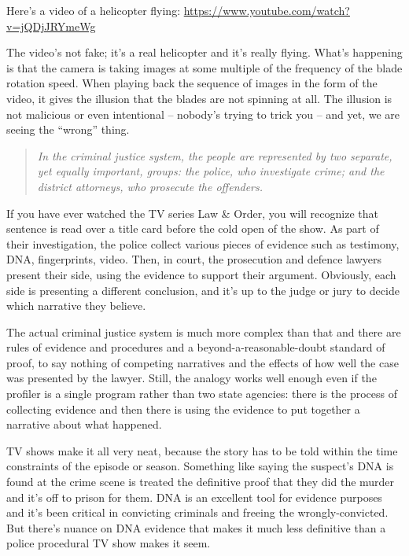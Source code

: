 




Here's a video of a helicopter flying: \url{https://www.youtube.com/watch?v=jQDjJRYmeWg} 

The video's not fake; it's a real helicopter and it's really flying. What's happening is that the camera is taking images at some multiple of the frequency of the blade rotation speed. When playing back the sequence of images in the form of the video, it gives the illusion that the blades are not spinning at all. The illusion is not malicious or even intentional -- nobody's trying to trick you -- and yet, we are seeing the ``wrong'' thing.

\vspace{-1em}
\begin{quote}
\textit{
In the criminal justice system, the people are represented by two separate, yet equally important, groups: the police, who investigate crime; and the district attorneys, who prosecute the offenders.
}
\end{quote}
\vspace{-1em}

If you have ever watched the TV series Law \& Order, you will recognize that sentence is read over a title card before the cold open of the show. As part of their investigation, the police collect various pieces of evidence such as testimony, DNA, fingerprints, video. Then, in court, the prosecution and defence lawyers present their side, using the evidence to support their argument. Obviously, each side is presenting a different conclusion, and it's up to the judge or jury to decide which narrative they believe.

The actual criminal justice system is much more complex than that and there are rules of evidence and procedures and a beyond-a-reasonable-doubt standard of proof, to say nothing of competing narratives and the effects of how well the case was presented by the lawyer. Still, the analogy works well enough even if the profiler is a single program rather than two state agencies: there is the process of collecting evidence and then there is using the evidence to put together a narrative about what happened. 

TV shows make it all very neat, because the story has to be told within the time constraints of the episode or season. Something like saying the suspect's DNA is found at the crime scene is treated the definitive proof that they did the murder and it's off to prison for them. DNA is an excellent tool for evidence purposes and it's been critical in convicting criminals and freeing the wrongly-convicted. But there's nuance on DNA evidence that makes it much less definitive than a police procedural TV show makes it seem.

